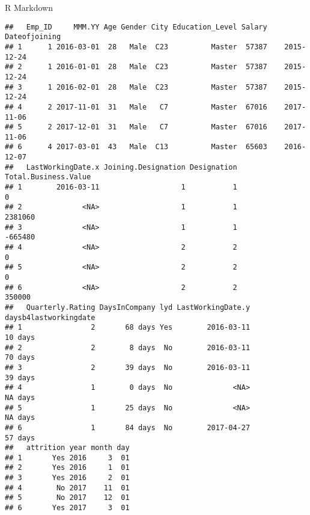 \documentclass[
  ignorenonframetext,
]{beamer}
\begin{document}
\begin{frame}[fragile]{R Markdown}
\begin{verbatim}
##   Emp_ID     MMM.YY Age Gender City Education_Level Salary Dateofjoining
## 1      1 2016-03-01  28   Male  C23          Master  57387    2015-12-24
## 2      1 2016-01-01  28   Male  C23          Master  57387    2015-12-24
## 3      1 2016-02-01  28   Male  C23          Master  57387    2015-12-24
## 4      2 2017-11-01  31   Male   C7          Master  67016    2017-11-06
## 5      2 2017-12-01  31   Male   C7          Master  67016    2017-11-06
## 6      4 2017-03-01  43   Male  C13          Master  65603    2016-12-07
##   LastWorkingDate.x Joining.Designation Designation Total.Business.Value
## 1        2016-03-11                   1           1                    0
## 2              <NA>                   1           1              2381060
## 3              <NA>                   1           1              -665480
## 4              <NA>                   2           2                    0
## 5              <NA>                   2           2                    0
## 6              <NA>                   2           2               350000
##   Quarterly.Rating DaysInCompany lyd LastWorkingDate.y daysb4lastworkingdate
## 1                2       68 days Yes        2016-03-11               10 days
## 2                2        8 days  No        2016-03-11               70 days
## 3                2       39 days  No        2016-03-11               39 days
## 4                1        0 days  No              <NA>               NA days
## 5                1       25 days  No              <NA>               NA days
## 6                1       84 days  No        2017-04-27               57 days
##   attrition year month day
## 1       Yes 2016     3  01
## 2       Yes 2016     1  01
## 3       Yes 2016     2  01
## 4        No 2017    11  01
## 5        No 2017    12  01
## 6       Yes 2017     3  01
\end{verbatim}
\end{frame}
\end{document}
